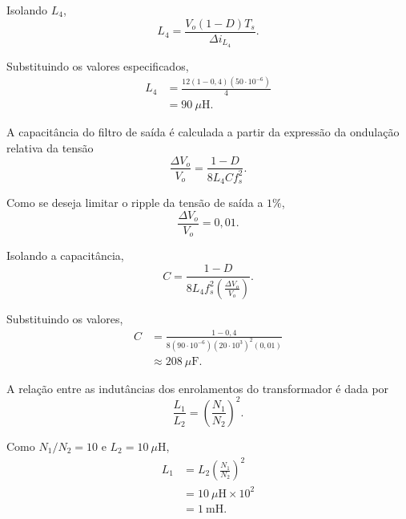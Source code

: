Isolando $L_4$,
\begin{equation*}
	L_4
	=
	\frac{V_o(1-D)T_s}
	{\Delta i_{L_4}}.
\end{equation*}

Substituindo os valores especificados,
\begin{equation*}
	\begin{aligned}
		L_4
		&=
		\frac{12(1-0{,}4)(50\cdot10^{-6})}
		{4}
		\\
		&=
		90~\mu\mathrm{H}.
	\end{aligned}
\end{equation*}

A capacitância do filtro de saída é calculada a partir da expressão da ondulação relativa da tensão
\begin{equation*}
	\frac{\Delta V_o}{V_o}
	=
	\frac{1-D}
	{8L_4Cf_s^2}.
\end{equation*}

Como se deseja limitar o ripple da tensão de saída a $1\%$,
\begin{equation*}
	\frac{\Delta V_o}{V_o}
	=
	0{,}01.
\end{equation*}

Isolando a capacitância,
\begin{equation*}
	C
	=
	\frac{1-D}
	{8L_4f_s^2
		\left(\frac{\Delta V_o}{V_o}\right)}.
\end{equation*}

Substituindo os valores,
\begin{equation*}
	\begin{aligned}
		C
		&=
		\frac{1-0{,}4}
		{8(90\cdot10^{-6})
			(20\cdot10^3)^2
			(0{,}01)}
		\\
		&\approx
		208~\mu\mathrm{F}.
	\end{aligned}
\end{equation*}

A relação entre as indutâncias dos enrolamentos do transformador é dada por
\begin{equation*}
	\frac{L_1}{L_2}
	=
	\left(\frac{N_1}{N_2}\right)^2.
\end{equation*}

Como $N_1/N_2=10$ e $L_2=10~\mu\mathrm{H}$,
\begin{equation*}
	\begin{aligned}
		L_1
		&=
		L_2
		\left(\frac{N_1}{N_2}\right)^2
		\\
		&=
		10~\mu\mathrm{H}\times10^2
		\\
		&=1~\mathrm{mH}.
	\end{aligned}
\end{equation*}

